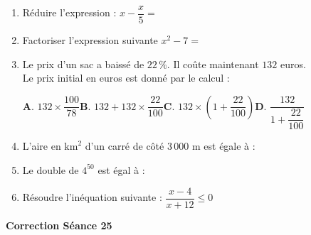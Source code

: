 \documentclass[a4paper,11pt]{article}
\begin{document}
\begin{seance}{} %
\begin{enumerate}
\item Réduire l'expression : $x-\dfrac{x}{5}=$\dotfill

\item Factoriser l'expression suivante $x^2-7=$\dotfill

\item  Le prix d'un sac a baissé de $22\,\%$. Il coûte maintenant $132$ euros. \\
    Le prix initial en euros est donné par le calcul :

\medskip
 
    
    	\textbf{A}. $132 \times \dfrac{100}{78}$\qquad \textbf{B}. $132 + 132 \times \dfrac{22}{100}$\qquad \textbf{C}. $132 \times \left(1 + \dfrac{22}{100}\right)$\qquad \textbf{D}. $\dfrac{132}{1 + \dfrac{22}{100}}$\qquad \\


\item  L'aire en $\text{km}^2$ d'un carré de côté $3\,000$ $\text{m}$ est égale à : \dotfill 

\item  Le double de  $4^{50}$ est égal à : \dotfill

\item Résoudre l'inéquation suivante : $\dfrac{x-4}{x+12} \leqslant 0$
\vspace{6cm}
\end{enumerate}

\end{seance}

\vspace{0.5cm}
\begin{center}

\textbf{\textcolor{Couleur8}{Correction Séance 25}}\\
\vspace{2mm}
\end{center}

\newpage
\end{document}
